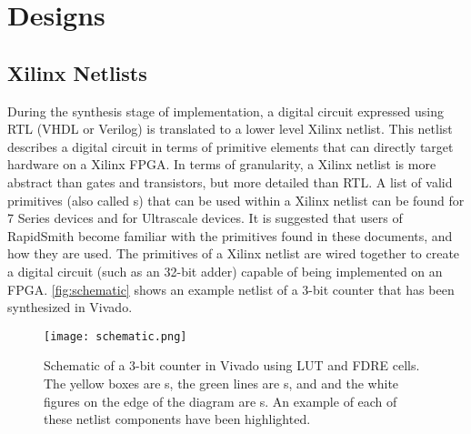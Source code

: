 \newpage
\section{Designs}

\subsection{Xilinx Netlists} \label{sec:xilinxNetlist}
During the synthesis stage of implementation, a digital circuit expressed using
RTL (VHDL or Verilog) is translated to a lower level Xilinx netlist. This
netlist describes a digital circuit in terms of primitive elements that can
directly target hardware on a Xilinx FPGA. In terms of granularity, a Xilinx
netlist is more abstract than gates and transistors, but more detailed than RTL. A list of valid
primitives (also called s) that can be used within a Xilinx netlist
can be found
\href{http://www.xilinx.com/support/documentation/sw_manuals/xilinx2016_2/ug953-vivado-7series-libraries.pdf}{\color{blue}{here}}
for 7 Series devices and
\href{http://www.xilinx.com/support/documentation/sw_manuals/xilinx2014_1/ug974-vivado-ultrascale-libraries.pdf}{\color{blue}{here}}
for Ultrascale devices. It is suggested that users of RapidSmith become
familiar with the primitives found in these documents, and how they are used.
The primitives of a Xilinx netlist are wired together to create a digital
circuit (such as an 32-bit adder) capable of being implemented on an FPGA.
\autoref{fig:schematic} shows an example netlist of a 3-bit counter that has
been synthesized in Vivado. 

\begin{figure}[H]
 \centering
 \texttt{[image: schematic.png]}
 \caption{Schematic of a 3-bit counter in Vivado using LUT and FDRE cells.
 The yellow boxes are s, the green lines are s, and and the
 white figures on the edge of the diagram are s. An example of each
 of these netlist components have been highlighted.}
 \label{fig:schematic}
\end{figure}

